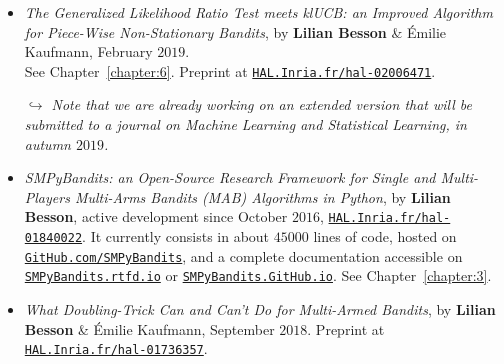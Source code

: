 \begin{itemize}

\item
    \emph{The Generalized Likelihood Ratio Test meets klUCB: an Improved Algorithm for Piece-Wise Non-Stationary Bandits},
    by \textbf{Lilian Besson} \& Émilie Kaufmann,
    February $2019$.\\
    See Chapter~\ref{chapter:6}.
    Preprint at \href{https://HAL.Inria.fr/hal-02006471}{\texttt{HAL.Inria.fr/hal-02006471}}.
    \cite{Besson2019GLRT}

    \emph{$\hookrightarrow$ Note that we are already working on an extended version that will be submitted to a journal on Machine Learning and Statistical Learning, in autumn $2019$.}

\item
    \emph{SMPyBandits: an Open-Source Research Framework for Single and Multi-Players Multi-Arms Bandits (MAB) Algorithms in Python},
    by \textbf{Lilian Besson}, active development since October $2016$,
    \href{https://HAL.Inria.fr/hal-01840022}{\texttt{HAL.Inria.fr/hal-01840022}}.
    It currently consists in about $45000$ lines of code, hosted on \href{https://GitHub.com/SMPyBandits}{\texttt{GitHub.com/SMPyBandits}},
    and a complete documentation accessible on \href{https://SMPyBandits.rtfd.io}{\texttt{SMPyBandits.rtfd.io}} or \href{https://SMPyBandits.GitHub.io}{\texttt{SMPyBandits.GitHub.io}}.
    See Chapter~\ref{chapter:3}.
    \cite{SMPyBanditsJMLR,SMPyBandits}

\item
    \emph{What Doubling-Trick Can and Can't Do for Multi-Armed Bandits},
    by \textbf{Lilian Besson} \& Émilie Kaufmann,
    September $2018$.
    Preprint at \href{https://HAL.Inria.fr/hal-01736357}{\texttt{HAL.Inria.fr/hal-01736357}}.
    \cite{Besson2018DoublingTricks}

\end{itemize}






